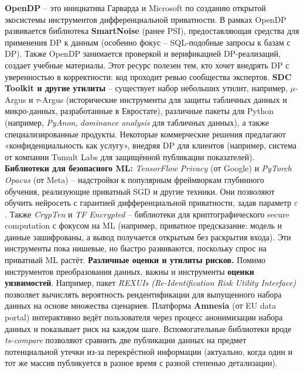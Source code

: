 \textbf{OpenDP} – это инициатива Гарварда и Microsoft по созданию открытой экосистемы инструментов дифференциальной приватности. В рамках OpenDP развивается библиотека \textbf{SmartNoise} (ранее PSI), предоставляющая средства для применения DP к данным (особенно фокус – SQL-подобные запросы к базам с DP). Также OpenDP занимается проверкой и верификацией DP-реализаций, создает учебные материалы. Этот ресурс полезен тем, кто хочет внедрять DP с уверенностью в корректности: код проходит ревью сообщества экспертов.
\textbf{SDC Toolkit и другие утилиты} – существует набор небольших утилит, например, $\mu$-Argus и $\tau$-Argus (исторические инструменты для защиты табличных данных и микро-данных, разработанные в Евростате), различные пакеты для Python (например, \textit{PyAnon}, \textit{dominance analysis} для табличных данных), а также специализированные продукты. Некоторые коммерческие решения предлагают «конфиденциальность как услугу», внедряя DP для клиентов (например, система от компании Tumult Labs для защищённой публикации показателей).
\textbf{Библиотеки для безопасного ML:} \textit{TensorFlow Privacy} (от Google) и \textit{PyTorch Opacus} (от Meta) – надстройки к популярным фреймворкам глубинного обучения, реализующие приватный SGD и другие техники. Они позволяют обучить нейросеть с гарантией дифференциальной приватности, задав параметр $\varepsilon$. Также \textit{CrypTen} и \textit{TF Encrypted} – библиотеки для криптографического secure computation с фокусом на ML (например, приватное предсказание: модель и данные зашифрованы, а вывод получается открытым без раскрытия входа). Эти инструменты пока нишевые, но быстро развиваются, поскольку спрос на приватный ML растёт.
\textbf{Различные оценки и утилиты рисков.} Помимо инструментов преобразования данных, важны и инструменты \textbf{оценки уязвимостей}. Например, пакет \textit{REXUIs (Re-Identification Risk Utility Interface)} позволяет вычислять вероятность реидентификации для выпущенного набора данных на основе множества сценариев. Платформа \textbf{Amnesia} (от EU data portal) интерактивно ведёт пользователя через процесс анонимизации набора данных и показывает риск на каждом шаге. Вспомогательные библиотеки вроде \textit{ts-compare} позволяют сравнить две публикации данных на предмет потенциальной утечки из-за перекрёстной информации (актуально, когда один и тот же массив публикуется в разное время с разной степенью детализации).
